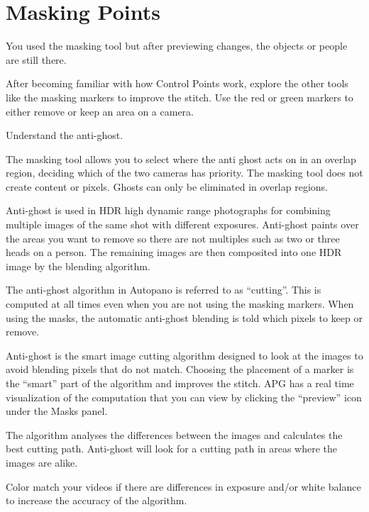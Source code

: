 \chapter{Masking Points}
\pagecolor{white}
\label{chap:41}
\begin{fullwidth}


\problem

{\large You used the masking tool but after previewing changes, the objects or people are still there. \par}

After becoming familiar with how Control Points work, explore the other tools like the masking markers to improve the stitch. Use the red or green markers to either remove or keep an area on a camera. 


\solutions

{\large Understand the anti-ghost. \par}

The masking tool allows you to select where the anti ghost acts on in an overlap region, deciding which of the two cameras has priority. The masking tool does not create content or pixels. Ghosts can only be eliminated in overlap regions.


Anti-ghost is used in HDR high dynamic range photographs for combining multiple images of the same shot with different exposures. Anti-ghost paints over the areas you want to remove so there are not multiples such as two or three heads on a person. The remaining images are then composited into one HDR image by the blending algorithm.

The anti-ghost algorithm in Autopano is referred to as “cutting”. This is computed at all times even when you are not using the masking markers. When using the masks, the automatic anti-ghost blending is told which pixels to keep or remove. 

Anti-ghost is the smart image cutting algorithm designed to look at the images to avoid blending pixels that do not match. Choosing the placement of a marker is the “smart” part of the algorithm and improves the stitch. APG has a real time visualization of the computation that you can view by clicking the “preview” icon under the Masks panel.

The algorithm analyses the differences between the images and calculates the best cutting path. Anti-ghost will look for a cutting path in areas where the images are alike. 

\tip Color match your videos if there are differences in exposure and/or white balance to increase the accuracy of the algorithm.


\end{fullwidth}
